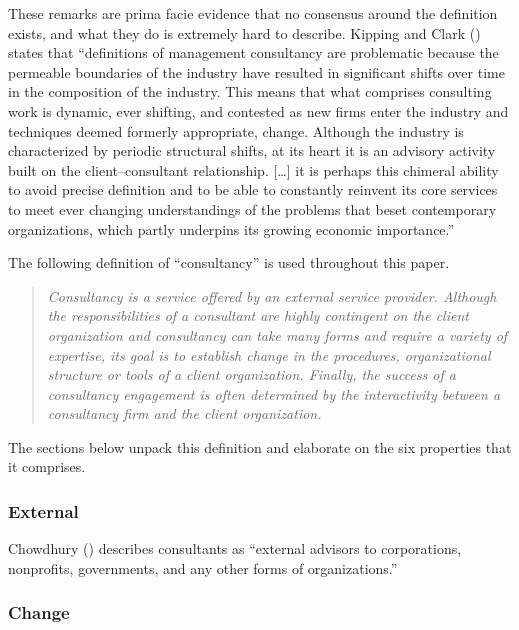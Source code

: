 \documentclass[
  man,floatsintext]{apa6}
\begin{document}
These remarks are prima facie evidence that no consensus around the definition exists, and what they do is extremely hard to describe. Kipping and Clark () states that ``definitions of management consultancy are problematic because the permeable boundaries of the industry have resulted in significant shifts over time in the composition of the industry. This means that what comprises consulting work is dynamic, ever shifting, and contested as new firms enter the industry and techniques deemed formerly appropriate, change. Although the industry is characterized by periodic structural shifts, at its heart it is an advisory activity built on the client--consultant relationship. {[}\ldots{]} it is perhaps this chimeral ability to avoid precise definition and to be able to constantly reinvent its core services to meet ever changing understandings of the problems that beset contemporary organizations, which partly underpins its growing economic importance.''

The following definition of ``consultancy'' is used throughout this paper.

\begin{quote}
\emph{Consultancy is a service offered by an external service provider. Although the responsibilities of a consultant are highly contingent on the client organization and consultancy can take many forms and require a variety of expertise, its goal is to establish change in the procedures, organizational structure or tools of a client organization. Finally, the success of a consultancy engagement is often determined by the interactivity between a consultancy firm and the client organization.}
\end{quote}

The sections below unpack this definition and elaborate on the six properties that it comprises.

\subsubsection{External}\label{external}

Chowdhury () describes consultants as ``external advisors to corporations, nonprofits, governments, and any other forms of organizations.''

\subsubsection{Change}\label{change}
\end{document}
